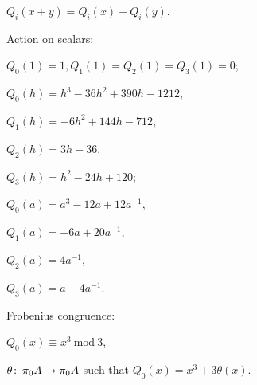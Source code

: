 \documentclass[12pt]{article}
\theoremstyle{definition}
\theoremstyle{remark}
\def\co{\colon\thinspace}
\begin{document}
$Q_i(x+y) = Q_i(x) + Q_i(y)$.  

Action on scalars: 

$Q_0(1) = 1, Q_1(1) = Q_2(1) = Q_3(1) = 0$; 

$Q_0(h) = h^3 - 36 h^2 + 390 h - 1212$, 

$Q_1(h) = -6 h^2 + 144 h - 712$, 

$Q_2(h) = 3 h - 36$, 

$Q_3(h) = h^2 - 24 h + 120$; 

$Q_0(a) = a^3 - 12 a + 12 a^{-1}$, 

$Q_1(a) = -6 a + 20 a^{-1}$, 

$Q_2(a) = 4 a^{-1}$, 

$Q_3(a) = a - 4 a^{-1}$.  

Frobenius congruence: 

$Q_0(x) \equiv x^3~\text{mod}~3$, 

$\theta\co\pi_0A \to \pi_0A$ such that $Q_0(x) = x^3 + 3 \theta(x)$.  
\end{document}
